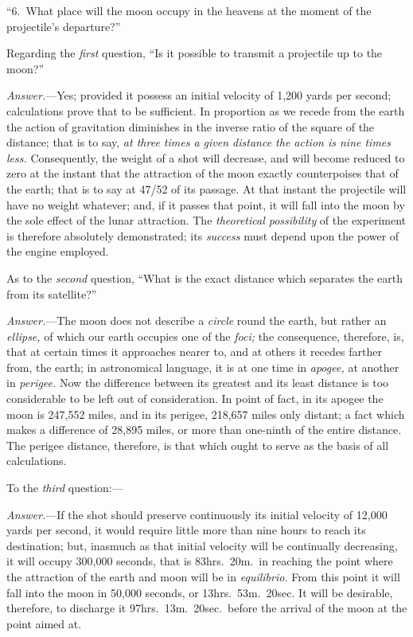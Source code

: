 \documentclass[a4paper]{article}
\begin{document}
``6.~What place will the moon occupy in the heavens at the moment of the
projectile’s departure?''

Regarding the \emph{first} question, ``Is it possible to transmit a projectile
up to the moon?''

\emph{Answer.}---Yes; provided it possess an initial velocity of 1,200 yards per
second; calculations prove that to be sufficient. In proportion as we recede
from the earth the action of gravitation diminishes in the inverse ratio of the
square of the distance; that is to say, \emph{at three times a given distance
the action is nine times less.} Consequently, the weight of a shot will
decrease, and will become reduced to zero at the instant that the attraction of
the moon exactly counterpoises that of the earth; that is to say at 47/52 of
its passage. At that instant the projectile will have no weight whatever; and,
if it passes that point, it will fall into the moon by the sole effect of the
lunar attraction. The \emph{theoretical possibility} of the experiment is
therefore absolutely demonstrated; its \emph{success} must depend upon the
power of the engine employed.

As to the \emph{second} question, ``What is the exact distance which separates
the earth from its satellite?''

\emph{Answer.}---The moon does not describe a \emph{circle} round the earth,
but rather an \emph{ellipse,} of which our earth occupies one of the
\emph{foci;} the consequence, therefore, is, that at certain times it
approaches nearer to, and at others it recedes farther from, the earth; in
astronomical language, it is at one time in \emph{apogee,} at another in
\emph{perigee.} Now the difference between its greatest and its least distance
is too considerable to be left out of consideration. In point of fact, in its
apogee the moon is 247,552 miles, and in its perigee, 218,657 miles only
distant; a fact which makes a difference of 28,895 miles, or more than
one-ninth of the entire distance. The perigee distance, therefore, is that
which ought to serve as the basis of all calculations.

To the \emph{third} question:---

\emph{Answer.}---If the shot should preserve continuously its initial velocity
of 12,000 yards per second, it would require little more than nine hours to
reach its destination; but, inasmuch as that initial velocity will be
continually decreasing, it will occupy 300,000 seconds, that is 83hrs.\ 20m.\ in
reaching the point where the attraction of the earth and moon will be in
\emph{equilibrio.} From this point it will fall into the moon in 50,000
seconds, or 13hrs.\ 53m.\ 20sec. It will be desirable, therefore, to discharge
it 97hrs.\ 13m.\ 20sec.\ before the arrival of the moon at the point aimed at.
\end{document}
